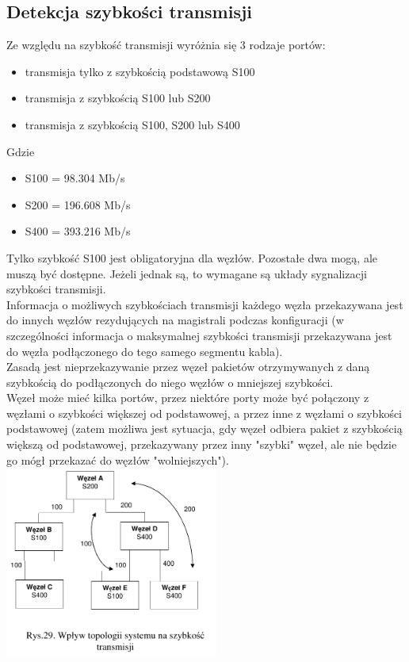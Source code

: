 \subsection{Detekcja szybkości transmisji}
Ze względu na szybkość transmisji wyróżnia się 3 rodzaje portów:
\begin{itemize}
	\item transmisja tylko z szybkością podstawową S100
	\item transmisja z szybkością S100 lub S200
	\item transmisja z szybkością S100, S200 lub S400
\end{itemize}
Gdzie
\begin{itemize}
	\item S100 = 98.304 Mb/s
	\item S200 = 196.608 Mb/s
	\item S400 = 393.216 Mb/s
\end{itemize}
Tylko szybkość S100 jest obligatoryjna dla węzłów. Pozostałe dwa mogą, ale muszą być dostępne. Jeżeli jednak są, to wymagane są układy sygnalizacji szybkości transmisji.\\
Informacja o możliwych szybkościach transmisji każdego węzła przekazywana jest do innych węzłów rezydujących na magistrali podczas konfiguracji (w szczególności informacja o maksymalnej szybkości transmisji przekazywana jest do węzła podłączonego do tego samego segmentu kabla).\\
Zasadą jest nieprzekazywanie przez węzeł pakietów otrzymywanych z daną szybkością do podłączonych do niego węzłów o mniejszej szybkości.\\
Węzeł może mieć kilka portów, przez niektóre porty może być połączony z węzłami o szybkości większej od podstawowej, a przez inne z węzłami o szybkości podstawowej (zatem możliwa jest sytuacja, gdy węzeł odbiera pakiet z szybkością większą od podstawowej, przekazywany przez inny "szybki" węzeł, ale nie będzie go mógł przekazać do węzłów "wolniejszych").\\
\includegraphics[width=7cm]{./wyklady/FIREWIRE_31_1.pdf}

